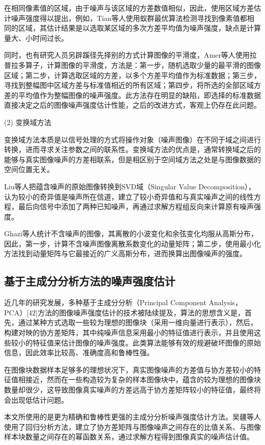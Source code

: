 在相同像素值的区域，由于噪声与该区域的方差数值相似，因此，使用区域方差估计噪声强度得以提出，例如，Tian等人\cite{38}使用蚁群最优算法检测寻找到像素值都相同的区域，其估计结果是以选取某区域的多次方差平均值为噪声强度，缺点是计算量大、小时间过长。

同时，也有研究人员另辟蹊径先择别的方式计算图像的平滑度，Amer等人\cite{39}使用拉普拉多算子，计算图像的平滑度，方法是：第一步，随机选取少量的最平滑的图像区域；第二步，计算选取区域的方差，以多个方差平均值作为标准数据；第三步，寻找到整幅图中区域方差与标准值相近的所有区域；第四步，将所选的全部区域方差的平均值作为整幅图像的噪声强度。此方法存在明显的缺陷，即选择的标准数据直接决定之后的图像噪声强度估计性能，之后的改进方式，客观上仍存在此问题。

(2)	变换域方法

变换域方法本质是以信号处理的方式将操作对象（噪声图像）在不同于域之间进行转换，进而寻求关注参数之间的联系性。变换域方法的优点是，通常转换域之后的能够与真实图像噪声的方差相联系，但是相区别于空间域方法之处是与图像数据的空间位置无关。


Liu等人\cite{40}把蕴含噪声的原始图像转换到SVD域（Singular Value Decomposition），认为较小的奇异值是噪声所在信道，建立了较小奇异值和与真实噪声之间的线性方程，最后向信号中添加了两种已知噪声，再通过求解方程组反向来计算原有噪声强度。

Ghazi等人\cite{41}统计不含噪声的图像，其离散的小波变化和余弦变化均服从高斯分布，因此，第一步，计算不含噪声图像离散系数变化的动量矩阵；第二步，使用最小化方法找到动量矩阵与它最接近的广义高斯分布，进而换算出图像噪声的强度。

\subsection{基于主成分分析方法的噪声强度估计}

近几年的研究发展，多种基于主成分分析（Principal Component Analysis，PCA）[42]方法的图像噪声强度估计的技术被陆续提及，算法的思想含义是，首先，通过某种方式选取一些较为理想的图像块（采用一维向量进行表示），然后，构建对映的协方差矩阵，其中纯噪声信息采用最小的特征值进行表示，并且使用这些较小的特征值来估计图像的噪声强度。此类算法能够有效的规避破坏图像的原始信息，因此效率比较高、准确度高和鲁棒性强。

在图像块数据样本足够多的理想状况下，真实图像噪声的方差值与协方差较小的特征值相接近，然而在一些构造较为复杂的样本图像块中，蕴含的较为理想的图像块数量却很少\cite{43}，这导致图像真实噪声的方差远高于协方差矩阵较小的特征值，最终将会出现低估计问题。

本文所使用的是更为精确和鲁棒性更强的主成分分析噪声强度估计方法。吴疆等人\cite{44}使用了回归分析方法，建立了协方差矩阵与图像噪声之间存在的比值关系、与图像样本块数量之间存在的幂函数关系，通过求解方程得到图像真实的噪声估计值。


